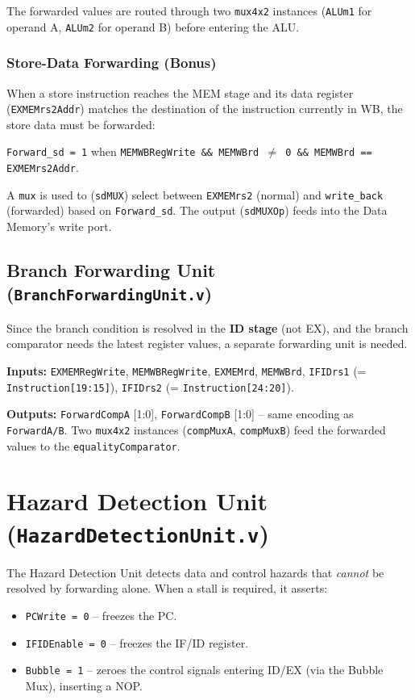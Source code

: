\documentclass[12pt,a4paper]{article}
\begin{document}
The forwarded values are routed through two \texttt{mux4x2} instances (\texttt{ALUm1} for operand A, \texttt{ALUm2} for operand B) before entering the ALU.

\subsubsection{Store-Data Forwarding (Bonus)}

When a store instruction reaches the MEM stage and its data register (\texttt{EXMEMrs2Addr}) matches the destination of the instruction currently in WB, the store data must be forwarded:

\texttt{Forward\_sd = 1} when \texttt{MEMWBRegWrite \&\& MEMWBrd $\neq$ 0 \&\& MEMWBrd == EXMEMrs2Addr}.

A \texttt{mux} is used to (\texttt{sdMUX}) select between \texttt{EXMEMrs2} (normal) and \texttt{write\_back} (forwarded) based on \texttt{Forward\_sd}. The output (\texttt{sdMUXOp}) feeds into the Data Memory's write port.

\subsection{Branch Forwarding Unit (\texttt{BranchForwardingUnit.v})}

Since the branch condition is resolved in the \textbf{ID stage} (not EX), and the branch comparator needs the latest register values, a separate forwarding unit is needed.

\textbf{Inputs:} \texttt{EXMEMRegWrite}, \texttt{MEMWBRegWrite}, \texttt{EXMEMrd}, \texttt{MEMWBrd}, \texttt{IFIDrs1} (= \texttt{Instruction[19:15]}), \texttt{IFIDrs2} (= \texttt{Instruction[24:20]}).

\textbf{Outputs:} \texttt{ForwardCompA} [1:0], \texttt{ForwardCompB} [1:0] -- same encoding as \texttt{ForwardA/B}. Two \texttt{mux4x2} instances (\texttt{compMuxA}, \texttt{compMuxB}) feed the forwarded values to the \texttt{equalityComparator}.

\section{Hazard Detection Unit (\texttt{HazardDetectionUnit.v})}

The Hazard Detection Unit detects data and control hazards that \emph{cannot} be resolved by forwarding alone. When a stall is required, it asserts:
\begin{itemize}
    \item \texttt{PCWrite = 0} -- freezes the PC.
    \item \texttt{IFIDEnable = 0} -- freezes the IF/ID register.
    \item \texttt{Bubble = 1} -- zeroes the control signals entering ID/EX (via the Bubble Mux), inserting a NOP.
\end{itemize}
\end{document}
